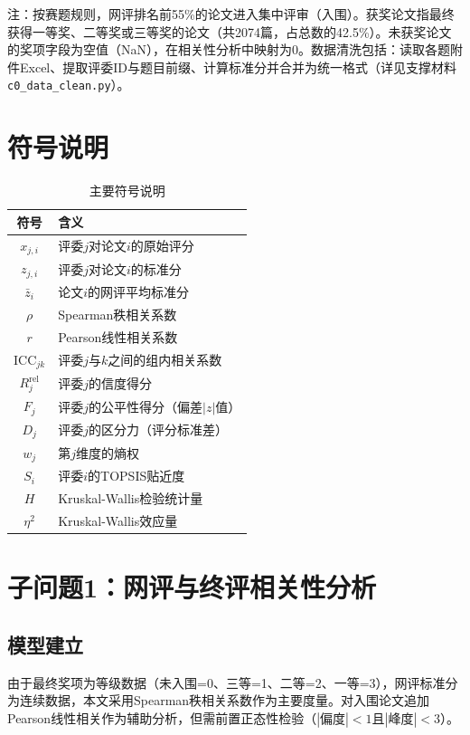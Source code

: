 \documentclass[UTF8,12pt]{ctexart}
\begin{document}
注：按赛题规则，网评排名前55\%的论文进入集中评审（入围）。获奖论文指最终获得一等奖、二等奖或三等奖的论文（共2074篇，占总数的42.5\%）。未获奖论文的奖项字段为空值（NaN），在相关性分析中映射为0。数据清洗包括：读取各题附件Excel、提取评委ID与题目前缀、计算标准分并合并为统一格式（详见支撑材料 \texttt{c0\_data\_clean.py}）。

\section{符号说明}

\begin{table}[H]
\centering
\caption{主要符号说明}
\begin{tabular}{cl}
\toprule
符号 & 含义 \\
\midrule
$x_{j,i}$ & 评委$j$对论文$i$的原始评分 \\
$z_{j,i}$ & 评委$j$对论文$i$的标准分 \\
$\bar{z}_i$ & 论文$i$的网评平均标准分 \\
$\rho$ & Spearman秩相关系数 \\
$r$ & Pearson线性相关系数 \\
$\text{ICC}_{jk}$ & 评委$j$与$k$之间的组内相关系数 \\
$R_j^{\text{rel}}$ & 评委$j$的信度得分 \\
$F_j$ & 评委$j$的公平性得分（偏差$|z|$值） \\
$D_j$ & 评委$j$的区分力（评分标准差） \\
$w_j$ & 第$j$维度的熵权 \\
$S_i$ & 评委$i$的TOPSIS贴近度 \\
$H$ & Kruskal-Wallis检验统计量 \\
$\eta^2$ & Kruskal-Wallis效应量 \\
\bottomrule
\end{tabular}
\end{table}

\section{子问题1：网评与终评相关性分析}

\subsection{模型建立}

由于最终奖项为等级数据（未入围=0、三等=1、二等=2、一等=3），网评标准分为连续数据，本文采用Spearman秩相关系数作为主要度量。对入围论文追加Pearson线性相关作为辅助分析，但需前置正态性检验（$|\text{偏度}| < 1$且$|\text{峰度}| < 3$）。
\end{document}
